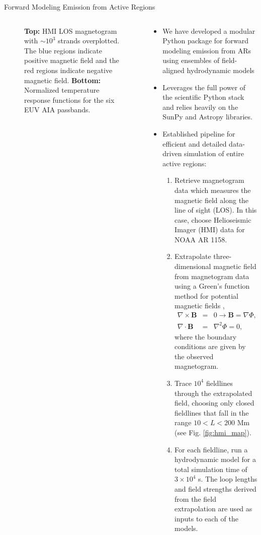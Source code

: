 \documentclass[final]{beamer}
\begin{document}
\begin{frame}
\begin{columns}[T]
\begin{column}{0.49\linewidth}
\begin{block}{Forward Modeling Emission from Active Regions}
\begin{columns}[c]
\begin{column}{0.49\columnwidth}
\begin{figure}
{                \label{fig:response_functions}}
                \caption{\textbf{Top:} HMI LOS magnetogram with $\sim10^3$ strands overplotted. The blue regions indicate positive magnetic field and the red regions indicate negative magnetic field. \textbf{Bottom:} Normalized temperature response functions for the six EUV AIA passbands.}
            \end{figure}
        \end{column}
        \begin{column}{0.49\columnwidth}
            \begin{itemize}
                \item We have developed a modular Python package for forward modeling emission from ARs using ensembles of field-aligned hydrodynamic models
                \item Leverages the full power of the scientific Python stack and relies heavily on the SunPy \citep{sunpy_community_sunpypython_2015} and Astropy \citep{astropy_collaboration_astropy:_2013} libraries.
                \item Established pipeline for efficient and detailed data-driven simulation of \alert{entire active regions}:
                \begin{enumerate}
                    \item Retrieve magnetogram data which measures the magnetic field along the line of sight (LOS). In this case, choose Helioseismic Imager (HMI) data for NOAA AR 1158.
                    \item Extrapolate three-dimensional magnetic field from magnetogram data using a Green's function method for potential magnetic fields \citep{sakurai_greens_1982},
                    \begin{eqnarray*}
                        \nabla\times\mathbf{B} &=& 0 \rightarrow \mathbf{B} = \nabla\Phi, \\
                        \nabla\cdot\mathbf{B} &=& \nabla^2\Phi = 0,
                    \end{eqnarray*}
                    where the boundary conditions are given by the observed magnetogram.
                    \item Trace $10^4$ fieldlines through the extrapolated field, choosing only \alert{closed} fieldlines that fall in the range $10<L<200$ Mm (see Fig. \ref{fig:hmi_map}).
                    \item For each fieldline, run a hydrodynamic model for a total simulation time of $3\times10^4$ s. The loop lengths and field strengths derived from the field extrapolation are used as inputs to each of the models.

\end{enumerate}
\end{itemize}
\end{column}
\end{columns}
\end{block}
\end{column}
\end{columns}
\end{frame}
\end{document}

